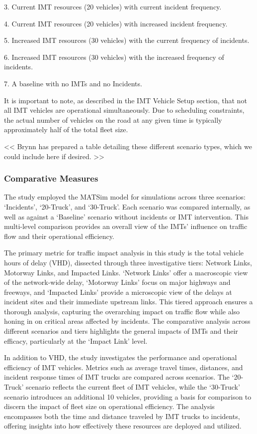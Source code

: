 \documentclass[
  letterpaper,
  authoryear]{elsarticle}
\begin{document}
3. Current IMT resources (20 vehicles) with current incident frequency.

4. Current IMT resources (20 vehicles) with increased incident
frequency.

5. Increased IMT resources (30 vehicles) with the current frequency of
incidents.

6. Increased IMT resources (30 vehicles) with the increased frequency of
incidents.

7. A baseline with no IMTs and no Incidents.

It is important to note, as described in the IMT Vehicle Setup section,
that not all IMT vehicles are operational simultaneously. Due to
scheduling constraints, the actual number of vehicles on the road at any
given time is typically approximately half of the total fleet size.

\textless\textless{} Brynn has prepared a table detailing these
different scenario types, which we could include here if desired.
\textgreater\textgreater{}

\hypertarget{comparative-measures}{%
\subsubsection{Comparative Measures}\label{comparative-measures}}

The study employed the MATSim model for simulations across three
scenarios: `Incidents', `20-Truck', and `30-Truck'. Each scenario was
compared internally, as well as against a `Baseline' scenario without
incidents or IMT intervention. This multi-level comparison provides an
overall view of the IMTs' influence on traffic flow and their
operational efficiency.

The primary metric for traffic impact analysis in this study is the
total vehicle hours of delay (VHD), dissected through three
investigative tiers: Network Links, Motorway Links, and Impacted Links.
`Network Links' offer a macroscopic view of the network-wide delay,
`Motorway Links' focus on major highways and freeways, and `Impacted
Links' provide a microscopic view of the delays at incident sites and
their immediate upstream links. This tiered approach ensures a thorough
analysis, capturing the overarching impact on traffic flow while also
honing in on critical areas affected by incidents. The comparative
analysis across different scenarios and tiers highlights the general
impacts of IMTs and their efficacy, particularly at the `Impact Link'
level.

In addition to VHD, the study investigates the performance and
operational efficiency of IMT vehicles. Metrics such as average travel
times, distances, and incident response times of IMT trucks are compared
across scenarios. The `20-Truck' scenario reflects the current fleet of
IMT vehicles, while the `30-Truck' scenario introduces an additional 10
vehicles, providing a basis for comparison to discern the impact of
fleet size on operational efficiency. The analysis encompasses both the
time and distance traveled by IMT trucks to incidents, offering insights
into how effectively these resources are deployed and utilized.
\end{document}
